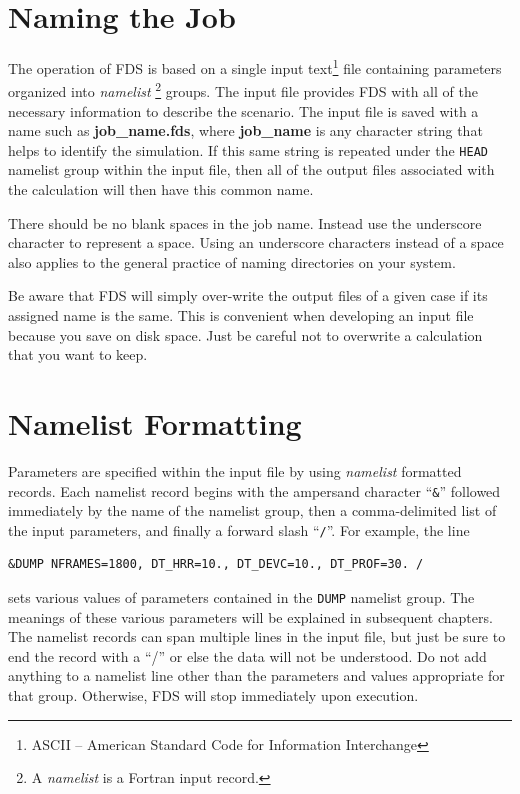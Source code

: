 \documentclass[11pt]{book}
\newcommand{\ct}{\tt\small}
\begin{document}
\section{Naming the Job}

The operation of FDS is based on a single input text\footnote{ASCII -- American Standard Code
for Information Interchange} file containing parameters organized into {\em namelist}
\footnote{A {\em namelist} is a Fortran input record.} groups.
The input file provides FDS  with all of the necessary information to
describe the scenario.
The input file is saved with a name such as {\bf job\_name.fds},
where {\bf job\_name} is any character string that helps to identify
the simulation. If this same string is repeated under the {\ct HEAD} namelist group within the
input file, then all of the output files associated with the calculation will then have this common name.

There should be no blank spaces in the job name. Instead use the underscore
character to represent a space.  Using an underscore characters instead of a space also applies
to the general practice of naming directories on your system.

Be aware that FDS will simply over-write the output files of a given case if its assigned
name is the same. This is convenient when developing an input file because you save on disk space. Just be careful
not to overwrite a calculation that you want to keep.



\section{Namelist Formatting}

\noindent
Parameters are specified within the input file by using {\em namelist} formatted records.
Each namelist record begins with the ampersand character ``{\ct \&}'' followed
immediately by the name of the namelist group, then a comma-delimited list of the input parameters, and
finally a forward slash ``{\ct /}''. For example, the line

\footnotesize
\begin{verbatim}
&DUMP NFRAMES=1800, DT_HRR=10., DT_DEVC=10., DT_PROF=30. /
\end{verbatim}

\normalsize \noindent
sets various values of parameters contained in the {\ct DUMP} namelist group. The meanings of these various parameters will
be explained in subsequent chapters. The namelist records can span multiple lines in the input file, but just be sure to
end the record with a ``/'' or else the data will not be understood. Do not add anything to a namelist line other than the
parameters and values appropriate for that group. Otherwise, FDS will stop immediately upon execution.
\end{document}
